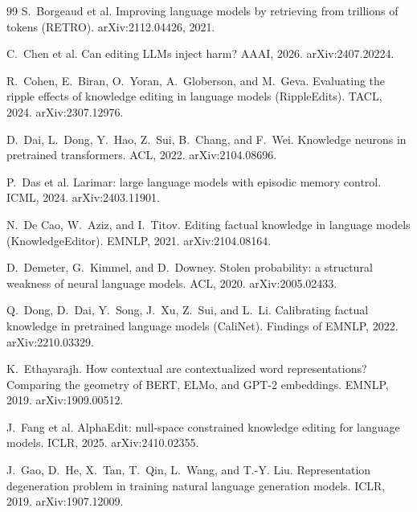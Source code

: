 \documentclass[11pt]{article}
\theoremstyle{remark}
\begin{document}
\begin{thebibliography}{99}
\small
{}
S.~Borgeaud et al.
\newblock Improving language models by retrieving from trillions of tokens (RETRO).
\newblock arXiv:2112.04426, 2021.

C.~Chen et al.
\newblock Can editing LLMs inject harm?
\newblock AAAI, 2026. arXiv:2407.20224.

R.~Cohen, E.~Biran, O.~Yoran, A.~Globerson, and M.~Geva.
\newblock Evaluating the ripple effects of knowledge editing in language models (RippleEdits).
\newblock TACL, 2024. arXiv:2307.12976.

D.~Dai, L.~Dong, Y.~Hao, Z.~Sui, B.~Chang, and F.~Wei.
\newblock Knowledge neurons in pretrained transformers.
\newblock ACL, 2022. arXiv:2104.08696.

P.~Das et al.
\newblock Larimar: large language models with episodic memory control.
\newblock ICML, 2024. arXiv:2403.11901.

N.~De Cao, W.~Aziz, and I.~Titov.
\newblock Editing factual knowledge in language models (KnowledgeEditor).
\newblock EMNLP, 2021. arXiv:2104.08164.

D.~Demeter, G.~Kimmel, and D.~Downey.
\newblock Stolen probability: a structural weakness of neural language models.
\newblock ACL, 2020. arXiv:2005.02433.

Q.~Dong, D.~Dai, Y.~Song, J.~Xu, Z.~Sui, and L.~Li.
\newblock Calibrating factual knowledge in pretrained language models (CaliNet).
\newblock Findings of EMNLP, 2022. arXiv:2210.03329.

K.~Ethayarajh.
\newblock How contextual are contextualized word representations? Comparing the geometry of BERT, ELMo, and GPT-2 embeddings.
\newblock EMNLP, 2019. arXiv:1909.00512.

J.~Fang et al.
\newblock AlphaEdit: null-space constrained knowledge editing for language models.
\newblock ICLR, 2025. arXiv:2410.02355.

J.~Gao, D.~He, X.~Tan, T.~Qin, L.~Wang, and T.-Y. Liu.
\newblock Representation degeneration problem in training natural language generation models.
\newblock ICLR, 2019. arXiv:1907.12009.


\end{thebibliography}
\end{document}
